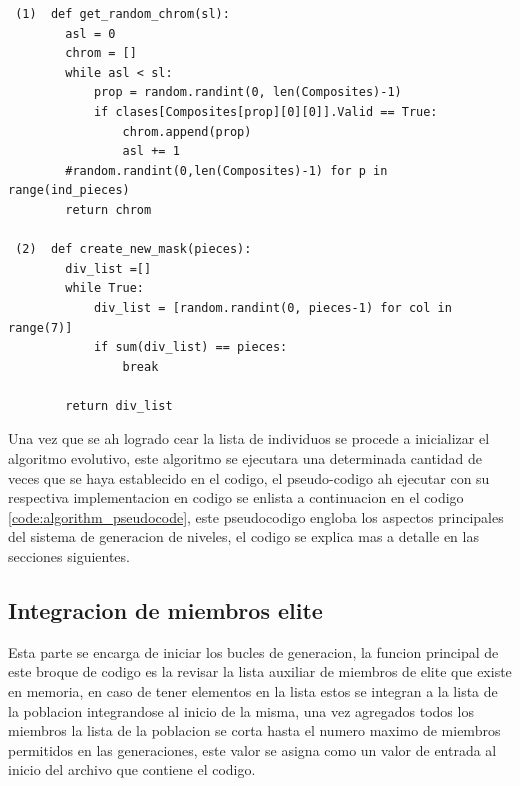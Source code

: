 \begin{listing}[ht]
  \begin{verbatim}
 (1)  def get_random_chrom(sl):
        asl = 0
        chrom = []
        while asl < sl:
            prop = random.randint(0, len(Composites)-1)
            if clases[Composites[prop][0][0]].Valid == True:
                chrom.append(prop)
                asl += 1
        #random.randint(0,len(Composites)-1) for p in range(ind_pieces)
        return chrom

 (2)  def create_new_mask(pieces):
        div_list =[]
        while True:
            div_list = [random.randint(0, pieces-1) for col in range(7)]
            if sum(div_list) == pieces:
                break
          
        return div_list
  \end{verbatim}
  \caption{Codigo de asignacion de cromosomas(piezas)[1] y codigo para generar mascaras [2]}
  \label{code:get_random_chrom}
\end{listing}

Una vez que se ah logrado cear la lista de individuos se procede a inicializar
el algoritmo evolutivo, este algoritmo se ejecutara una determinada cantidad de
veces que se haya establecido en el codigo, el pseudo-codigo ah ejecutar con su
respectiva implementacion en codigo se enlista a continuacion en el codigo
\ref{code:algorithm_pseudocode}, este pseudocodigo engloba los aspectos
principales del sistema de generacion de niveles, el codigo se explica mas a
detalle en las secciones siguientes.

\begin{listing}[ht]
  \scalebox{.8}{}
  \caption{Pseudo-codigo del algoritmo genetico}
  \label{code:algorithm_pseudocode}
\end{listing}

\subsection{Integracion de miembros elite}
\label{subsection:elite_member_integration}

Esta parte se encarga de iniciar los bucles de generacion, la funcion principal
de este broque de codigo es la revisar la lista auxiliar de miembros de elite
que existe en memoria, en caso de tener elementos en la lista estos se integran
a la lista de la poblacion integrandose al inicio de la misma, una vez agregados
todos los miembros la lista de la poblacion se corta hasta el numero maximo de
miembros permitidos en las generaciones, este valor se asigna como un valor de
entrada al inicio del archivo que contiene el codigo.

